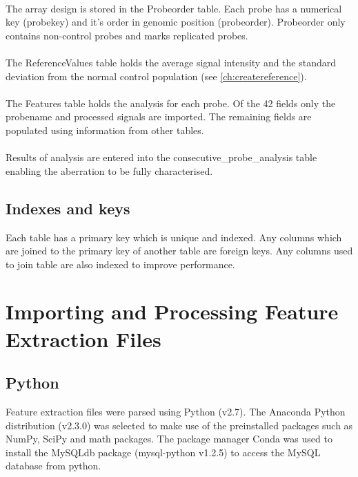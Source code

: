 \paragraph*{}
The array design is stored in the Probeorder table. Each probe has a numerical key (probekey) and it's order in genomic position (probeorder). Probeorder only contains non-control probes and marks replicated probes.
\paragraph*{}
The ReferenceValues table holds the average signal intensity and the standard deviation from the normal control population (see \ref{ch:createreference}).
\paragraph*{}
The Features table holds the analysis for each probe. Of the 42 fields only the probename and processed signals are imported. The remaining fields are populated using information from other tables.
\paragraph*{}
Results of analysis are entered into the consecutive\_probe\_analysis table enabling the aberration to be fully characterised.

\subsection{Indexes and keys}
Each table has a primary key which is unique and indexed. 
Any columns which are joined to the primary key of another table are foreign keys.
Any columns used to join table are also indexed to improve performance.

\section{Importing and Processing Feature Extraction Files}
\subsection{Python}
Feature extraction files were parsed using Python (v2.7)\cite{python_software_foundation_python_2010}. The Anaconda Python distribution (v2.3.0) \cite{continuum_why_2016} was selected to make use of the preinstalled packages such as NumPy, SciPy and math packages. The package manager Conda was used to install the MySQLdb package (mysql-python v1.2.5)\cite{dustman2014} to access the MySQL database from python. 
